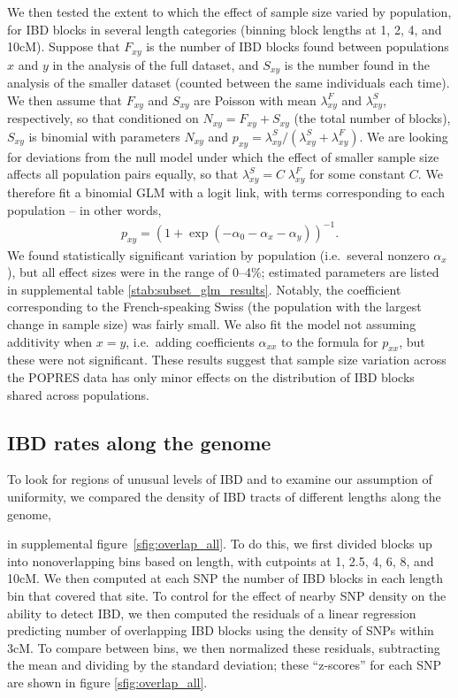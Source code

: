 \documentclass{article}
\begin{document}
We then tested the extent to which the effect of sample size varied by population,
for IBD blocks in several length categories (binning block lengths at 1, 2, 4, and 10cM).
Suppose that $F_{xy}$ is the number of IBD blocks found between populations $x$ and $y$ in the analysis of the full dataset,
and $S_{xy}$ is the number found in the analysis of the smaller dataset
(counted between the same individuals each time).
We then assume that $F_{xy}$ and $S_{xy}$ are Poisson with mean $\lambda^F_{xy}$ and $\lambda^S_{xy}$, respectively,
so that conditioned on $N_{xy} = F_{xy} + S_{xy}$ (the total number of blocks), 
$S_{xy}$ is binomial with parameters $N_{xy}$ and $p_{xy} = \lambda^S_{xy}/(\lambda^S_{xy}+\lambda^F_{xy})$.
We are looking for deviations from the null model under which the effect of smaller sample size affects all population pairs equally,
so that $\lambda^S_{xy} = C \; \lambda^F_{xy}$ for some constant $C$.
We therefore fit a binomial GLM \citep{mccullagh1989generalized} with a logit link,
with terms corresponding to each population -- in other words,
\begin{align*}
  p_{xy} = \left( 1 + \exp\left( - \alpha_0 - \alpha_x - \alpha_y \right) \right)^{-1} .
\end{align*}
We found statistically significant variation by population (i.e.\ several nonzero $\alpha_x$),
but all effect sizes were in the range of 0--4\%;
estimated parameters are listed in supplemental table \ref{stab:subset_glm_results}.
Notably, the coefficient corresponding to the French-speaking Swiss (the population with the largest change in sample size)
was fairly small.
We also fit the model not assuming additivity when $x=y$, i.e.\ adding coefficients $\alpha_{xx}$ to the formula for $p_{xx}$,
but these were not significant. These results suggest that sample size
variation across the POPRES data has only minor effects on the
distribution of IBD blocks shared across populations.


\subsection{IBD rates along the genome}
\label{ss:block_density}

To look for regions of unusual levels of IBD and to examine our assumption of uniformity,
we compared the density of IBD tracts of different lengths along the genome,

in supplemental figure~\ref{sfig:overlap_all}.
To do this, we first divided blocks up into nonoverlapping bins based on length,
with cutpoints at 1, 2.5, 4, 6, 8, and 10cM.
We then computed at each SNP the number of IBD blocks in each length bin that covered that site.
To control for the effect of nearby SNP density on the ability to detect IBD,
we then computed the residuals of a linear regression predicting number of overlapping IBD blocks
using the density of SNPs within 3cM.
To compare between bins, we then normalized these residuals,
subtracting the mean and dividing by the standard deviation;
these ``z-scores'' for each SNP are shown in figure \ref{sfig:overlap_all}.
\end{document}

